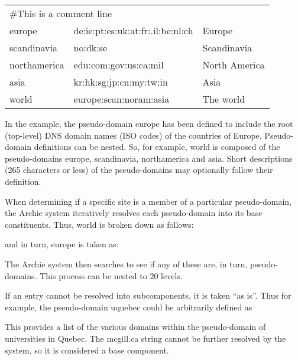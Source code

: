 \begin{center}
\begin{tabular}{lll}
\multicolumn{3}{l}{\#This is a comment line} \\

europe      &  de:ie:pt:es:uk:at:fr:.il:be:nl:ch  & Europe \\

scandinavia  &  no:dk:se    &                       Scandinavia \\

northamerica &  edu:com:gov:us:ca:mil &              North America \\

asia   &      kr:hk:sg:jp:cn:my:tw:in  &          Asia \\

world &       europe:scan:noram:asia    &         The world \\

\end{tabular}
\end{center}

In the example, the pseudo-domain europe has been defined to include the root (top-level) DNS domain names (ISO codes) of the countries of Europe. Pseudo-domain definitions can be nested. So, for example, world is composed of the pseudo-domains europe, scandinavia, northamerica and asia. Short descriptions (265 characters or less) of the pseudo-domains may optionally follow their definition.

When determining if a specific site is a member of a particular pseudo-domain, the Archie system iteratively resolves each pseudo-domain into its base constituents. Thus, world is broken down as follows: 


and in turn, europe is taken as:


The Archie system then searches to see if any of these are, in turn,
pseudo-domains. This process can be nested to 20 levels.

If an entry cannot be resolved into subcomponents, it is taken ``as is''. Thus
for example, the pseudo-domain uquebec could be arbitrarily defined as


This provides a list of the various domains within the pseudo-domain of universities in Quebec. The mcgill.ca string cannot be further resolved by the system, so it is considered a base component.

